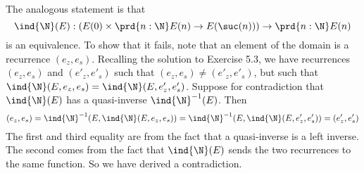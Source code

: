  \soln
The analogous statement is that
\[
  \ind{\N}(E) : \left(E(0) \times \prd{n:\N}E(n) \to E(\suc(n))\right)
  \to
  \prd{n:\N}E(n)
\]
is an equivalence.  To show that it fails, note that an element of the domain
is a recurrence $(e_{z}, e_{s})$.  Recalling the solution to Exercise 5.3, we
have recurrences $(e_{z}, e_{s})$ and $(e'_{z}, e'_{s})$ such that $(e_{z},
e_{s}) \neq (e'_{z}, e'_{s})$, but such that $\ind{\N}(E, e_{z}, e_{s}) =
\ind{\N}(E, e'_{z}, e'_{s})$.  Suppose for contradiction that
$\ind{\N}(E)$ has a quasi-inverse $\ind{\N}^{-1}(E)$.  Then 
\[
  (e_{z}, e_{s}) 
  =
  \ind{\N}^{-1}(E, \ind{\N}(E, e_{z}, e_{s}))
  =
  \ind{\N}^{-1}(E, \ind{\N}(E, e'_{z}, e'_{s}))
  =
  (e'_{z}, e'_{s}) 
\]
The first and third equality are from the fact that a quasi-inverse is a left
inverse.  The second comes from the fact that $\ind{\N}(E)$ sends the two
recurrences to the same function.  So we have derived a contradiction.
